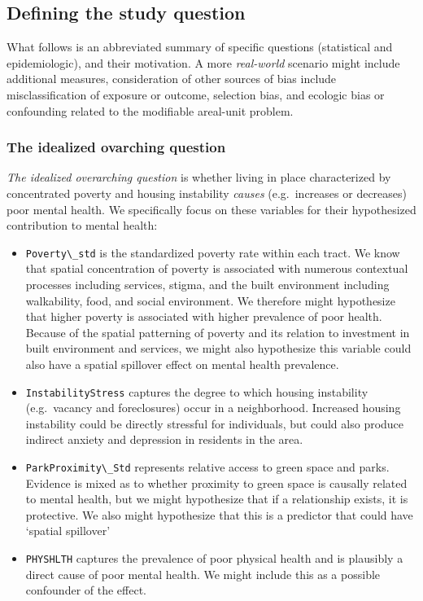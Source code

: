 \documentclass[
]{book}
\newcommand{\passthrough}[1]{#1}
\providecommand{\tightlist}{%
  \setlength{\itemsep}{0pt}\setlength{\parskip}{0pt}}
\begin{document}
\hypertarget{defining-the-study-question}{%
\subsection{Defining the study question}\label{defining-the-study-question}}

What follows is an abbreviated summary of specific questions (statistical and epidemiologic), and their motivation. A more \emph{real-world} scenario might include additional measures, consideration of other sources of bias include misclassification of exposure or outcome, selection bias, and ecologic bias or confounding related to the modifiable areal-unit problem.

\hypertarget{the-idealized-ovarching-question}{%
\subsubsection{The idealized ovarching question}\label{the-idealized-ovarching-question}}

\emph{The idealized overarching question} is whether living in place characterized by concentrated poverty and housing instability \emph{causes} (e.g.~increases or decreases) poor mental health. We specifically focus on these variables for their hypothesized contribution to mental health:

\begin{itemize}
\tightlist
\item
  \passthrough{\lstinline!Poverty\_std!} is the standardized poverty rate within each tract. We know that spatial concentration of poverty is associated with numerous contextual processes including services, stigma, and the built environment including walkability, food, and social environment. We therefore might hypothesize that higher poverty is associated with higher prevalence of poor health. Because of the spatial patterning of poverty and its relation to investment in built environment and services, we might also hypothesize this variable could also have a spatial spillover effect on mental health prevalence.
\item
  \passthrough{\lstinline!InstabilityStress!} captures the degree to which housing instability (e.g.~vacancy and foreclosures) occur in a neighborhood. Increased housing instability could be directly stressful for individuals, but could also produce indirect anxiety and depression in residents in the area.
\item
  \passthrough{\lstinline!ParkProximity\_Std!} represents relative access to green space and parks. Evidence is mixed as to whether proximity to green space is causally related to mental health, but we might hypothesize that if a relationship exists, it is protective. We also might hypothesize that this is a predictor that could have `spatial spillover'
\item
  \passthrough{\lstinline!PHYSHLTH!} captures the prevalence of poor physical health and is plausibly a direct cause of poor mental health. We might include this as a possible confounder of the effect.
\end{itemize}
\end{document}
